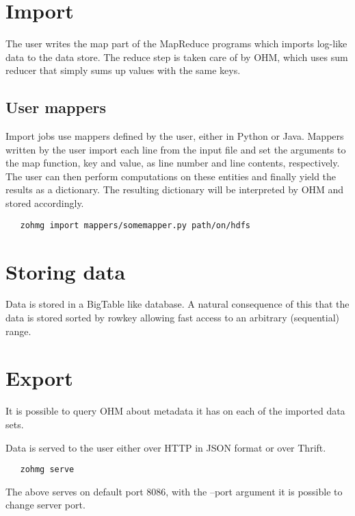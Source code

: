 \documentclass[a4paper,10pt]{book}
\begin{document}
\section{Import}

The user writes the map part of the MapReduce programs which imports
log-like data to the data store. The reduce step is taken care of by OHM,
which uses sum reducer that simply sums up values with the same keys.


\subsection{User mappers}

Import jobs use mappers defined by the user, either in Python or Java.
Mappers written by the user import each line from the input file and set
the arguments to the map function, key and value, as line number and line
contents, respectively. The user can then perform computations on these
entities and finally yield the results as a dictionary. The resulting
dictionary will be interpreted by OHM and stored accordingly.

\begin{verbatim}
   zohmg import mappers/somemapper.py path/on/hdfs
\end{verbatim}


\section{Storing data}

Data is stored in a BigTable like database. A natural consequence of this
that the data is stored sorted by rowkey allowing fast access to an
arbitrary (sequential) range.



\section{Export}

It is possible to query OHM about metadata it has on each of the imported
data sets.

Data is served to the user either over HTTP in JSON format or over Thrift.
\cite{thrift}

\begin{verbatim}
   zohmg serve
\end{verbatim}

\noindent The above serves on default port 8086, with the --port argument
it is possible to change server port.
\end{document}
